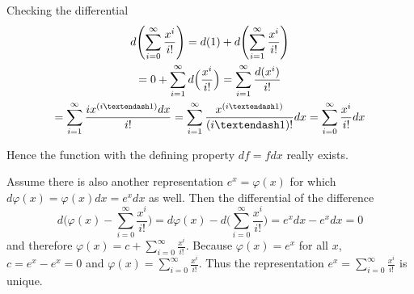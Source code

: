 \documentclass[11pt, twoside]{book}
\begin{document}
Checking the differential
\begin{gather*}
d \Biggl( \sum_{i=0}^{\infty} \frac{x^i}{i!} \Biggr) = d(1) + d \Biggl( \sum_{i=1}^{\infty} \frac{x^i}{i!} \Biggr) \\
= 0 + \sum_{i=1}^{\infty} d \Bigl( \frac{x^i}{i!} \Bigr)
= \sum_{i=1}^{\infty} \frac{d(x^i)}{i!} \\
= \sum_{i=1}^{\infty} \frac{i x^{(i–1)} dx}{i!}
= \sum_{i=1}^{\infty} \frac{x^{(i–1)}}{(i–1)!} dx
= \sum_{i=0}^{\infty} \frac{x^i}{i!} dx
\end{gather*}

Hence the function with the defining property $df = fdx$ really exists.

Assume there is also another representation $e^x = \varphi(x)$ for which $d\varphi(x) = \varphi(x) dx = e^x dx$ as well.
Then the differential of the difference
\begin{equation*}
d \Biggl( \varphi(x) - \sum_{i=0}^{\infty} \frac{x^i}{i!} \Biggr) \!
= d \varphi(x) - d \Biggl( \sum_{i=0}^{\infty} \frac{x^i}{i!} \Biggr)
= e^x dx - e^x dx = 0
\end{equation*}
and therefore $\varphi(x) = c + \sum_{i=0}^{\infty} \frac{x^i}{i!}$.
Because $\varphi(x) = e^x$ for all $x$, $c = e^x - e^x = 0$ and $\varphi(x) = \sum_{i=0}^{\infty} \frac{x^i}{i!}$.
Thus the representation $e^x = \sum_{i=0}^{\infty} \frac{x^i}{i!}$ is unique.
\end{document}
